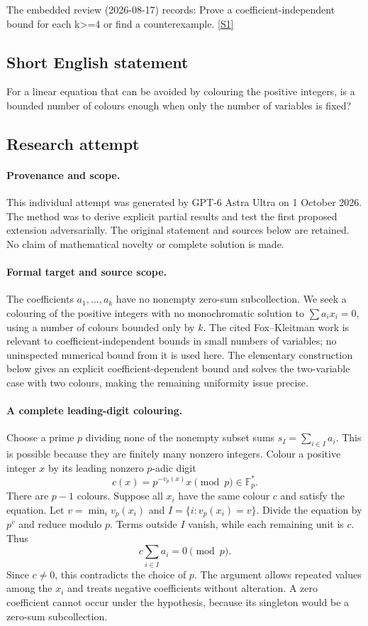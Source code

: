 \documentclass[11pt,a4paper]{article}
\newcommand{\F}{\mathbb{F}}
\newcommand{\sref}[2]{\hyperlink{source:#1:#2}{[S#2]}}
\begin{document}
The embedded review (2026-08-17) records: Prove a coefficient-independent bound for each k>=4 or find a counterexample. \sref{statement}{1}

\subsection{Short English statement}

For a linear equation that can be avoided by colouring the positive integers, is a bounded number of colours enough when only the number of variables is fixed?

\subsection{Research attempt}

\paragraph{Provenance and scope.}
This individual attempt was generated by GPT-6 Astra Ultra on 1 October 2026. The method was to derive explicit partial results and test the first proposed extension adversarially. The original statement and sources below are retained. No claim of mathematical novelty or complete solution is made.

\paragraph{Formal target and source scope.}
The coefficients $a_1,\ldots,a_k$ have no nonempty zero-sum subcollection. We seek a colouring of the positive integers with no monochromatic solution to $\sum a_ix_i=0$, using a number of colours bounded only by $k$. The cited Fox--Kleitman work is relevant to coefficient-independent bounds in small numbers of variables; no uninspected numerical bound from it is used here. The elementary construction below gives an explicit coefficient-dependent bound and solves the two-variable case with two colours, making the remaining uniformity issue precise.

\paragraph{A complete leading-digit colouring.}
Choose a prime $p$ dividing none of the nonempty subset sums $s_I=\sum_{i\in I}a_i$. This is possible because they are finitely many nonzero integers. Colour a positive integer $x$ by its leading nonzero $p$-adic digit
\[
 c(x)=p^{-v_p(x)}x\pmod p\in\F_p^*.
\]
There are $p-1$ colours. Suppose all $x_i$ have the same colour $c$ and satisfy the equation. Let $v=\min_i v_p(x_i)$ and $I=\{i:v_p(x_i)=v\}$. Divide the equation by $p^v$ and reduce modulo $p$. Terms outside $I$ vanish, while each remaining unit is $c$. Thus
\[
 c\sum_{i\in I}a_i=0\pmod p.
\]
Since $c\ne0$, this contradicts the choice of $p$. The argument allows repeated values among the $x_i$ and treats negative coefficients without alteration. A zero coefficient cannot occur under the hypothesis, because its singleton would be a zero-sum subcollection.
\end{document}
